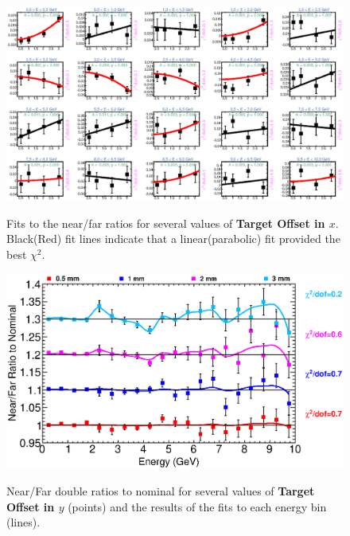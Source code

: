 \begin{figure}[ht]
  \begin{center}
    {\includegraphics[width=5.0in]{figures/TargetXOffset_nof_fits.eps}}
  \end{center}
\caption{ Fits to the near/far ratios for several values of {\bf Target Offset in $x$}. Black(Red) fit lines indicate that a linear(parabolic) fit provided the best $\chi^2$. }
\end{figure}

\begin{figure}[ht]
  \begin{center}
    {\includegraphics[width=6.0in]{figures/TargetYOffset_nof_summary.eps}}
  \end{center}
\caption{ Near/Far double ratios to nominal for several values of {\bf Target Offset in $y$} (points) and the results of the fits to each energy bin (lines).}
\end{figure}

